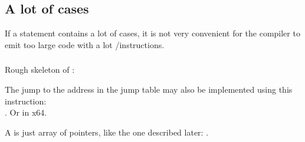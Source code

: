 \subsection{A lot of cases}

If a  statement contains a lot of cases, it is not very convenient for the compiler to emit too large code
with a lot \JE/\JNE instructions.







\subsubsection{\Conclusion{}}

Rough skeleton of :



The jump to the address in the jump table may also be implemented using this instruction: \\
.
Or  in x64.

A  is just array of pointers, like the one described later: .
